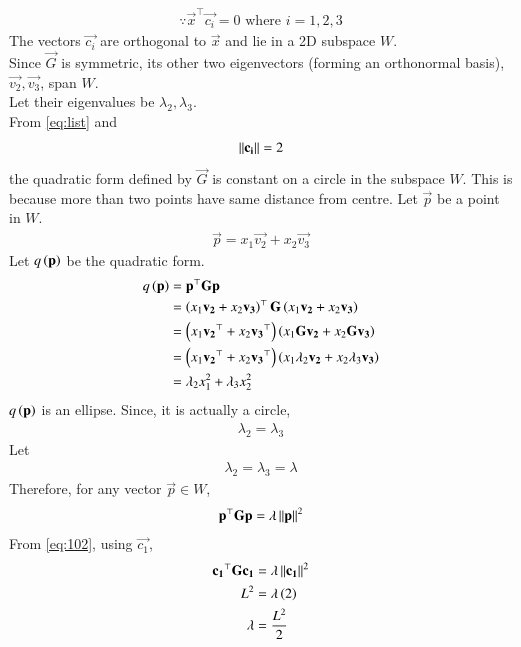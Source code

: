 \documentclass[journal]{IEEEtran}
\begin{document}
\begin{align}
	\because \vec{x}^\top\vec{c_i}=0\text{ where }i = 1, 2, 3
\end{align}
The vectors $\vec{c_i}$ are orthogonal to $\vec{x}$ and lie in a 2D subspace $W$. \\
Since $\vec{G}$ is symmetric, its other two eigenvectors (forming an orthonormal basis), $\vec{v_2}, \vec{v_3}$, span $W$. \\
Let their eigenvalues be $\lambda_2, \lambda_3$. \\
From \eqref{eq:list} and
\begin{align}
	\left\lVert\mathbf{c_i}\right\rVert = 2
\end{align}
the quadratic form defined by $\vec{G}$ is constant on a circle in the subspace $W$. This is because more than two points have same distance from centre. Let $\vec{p}$ be a point in $W$.
\begin{align}
	\vec{p} = x_1\vec{v_2}+x_2\vec{v_3} \label{eq:99}
\end{align}
Let $q\left(\mathbf{p}\right)$ be the quadratic form.
\begin{align}
	q\left(\mathbf{p}\right) &= \mathbf{p}^\top\mathbf{G}\mathbf{p} \\
	&= \left(x_1\mathbf{v_2}+x_2\mathbf{v_3}\right)^\top\mathbf{G}\left(x_1\mathbf{v_2}+x_2\mathbf{v_3}\right) \\
	&= \left(x_1\mathbf{v_2}^\top+x_2\mathbf{v_3}^\top\right)\left(x_1\mathbf{G}\mathbf{v_2}+x_2\mathbf{G}\mathbf{v_3}\right) \\
	&= \left(x_1\mathbf{v_2}^\top+x_2\mathbf{v_3}^\top\right)\left(x_1\lambda_2\mathbf{v_2}+x_2\lambda_3\mathbf{v_3}\right) \\
	&= \lambda_2 x_1^2+\lambda_3 x_2^2 \\
\end{align}
$q\left(\mathbf{p}\right)$ is an ellipse. Since, it is actually a circle,
\begin{align}
	\lambda_2 = \lambda_3
\end{align}
Let
\begin{align}
	\lambda_2 = \lambda_3 = \lambda
\end{align}
Therefore, for any vector $\vec{p} \in W$, 
\begin{align}
	\mathbf{p}^\top\mathbf{G}\mathbf{p} = \lambda\left\lVert\mathbf{p}\right\rVert^2 \label{eq:102}
\end{align}
From \eqref{eq:102}, using $\vec{c_1}$,
\begin{align}
    \mathbf{c_1}^\top\mathbf{G}\mathbf{c_1} &= \lambda\left\lVert\mathbf{c_1}\right\rVert^2 \\
    L^2 &= \lambda\left(2\right) \\
    \lambda &= \frac{L^2}{2}
\end{align}
\end{document}
